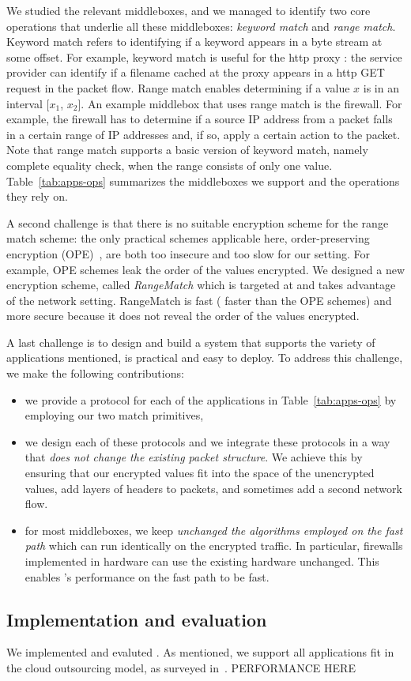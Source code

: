We studied the relevant middleboxes, and we managed to identify two core operations that underlie all these middleboxes: {\em keyword match} and {\em range match}. Keyword match refers to  identifying if a keyword appears in a byte stream at some offset.   For example, keyword match is useful for the http proxy : the service provider can identify if a filename cached at the proxy appears in a http GET request in the packet flow. %
Range match enables determining if a value $x$ is in an interval [$x_1$, $x_2$]. An example middlebox that uses range match is the firewall.   For example, the firewall has to determine if a source IP address from a packet falls in a certain range of IP addresses and, if so, apply a certain action to the packet.  Note that range match supports a basic version of keyword match, namely complete equality check, when the range consists of only one value.
%
Table~\ref{tab:apps-ops} summarizes the middleboxes we support and the operations they rely on. 


A second challenge is that there is no suitable encryption scheme for the range match scheme:
 the only practical schemes applicable here, order-preserving encryption (OPE)~\cite{boldyreva:ope,popa:mope}, are both too insecure and too slow for our setting.  For example, OPE schemes leak the order of the values encrypted. We designed a new encryption scheme, called {\em RangeMatch} which is targeted at and takes advantage of the network setting. RangeMatch  is fast ( faster than the OPE schemes) and more secure because it does not reveal the order of the values encrypted. 
 
A last challenge is to design and build a system that supports the variety of applications mentioned, is practical and easy to deploy. 
To address this challenge, we make the following contributions:
\begin{itemize}
\item we provide a  protocol for each of the applications in Table~\ref{tab:apps-ops} by employing our two match  primitives,
\item we design each of these protocols and we integrate these protocols in a way that {\em does not change the existing packet structure}. We achieve this by ensuring that our encrypted values fit into the space of the unencrypted values, add layers of headers to packets, and sometimes add a second network flow.
\item  for most middleboxes, we keep {\em unchanged  the algorithms employed on the fast path} which can run identically on the encrypted traffic. In particular, firewalls implemented in hardware can use the existing hardware unchanged.  This enables \sys's performance on the fast path to be fast. 
\end{itemize}


\subsection{Implementation and evaluation}

We implemented and evaluted \sys. As mentioned, we support all applications fit in the cloud outsourcing model, as surveyed in~\cite{aplomb}. PERFORMANCE HERE
